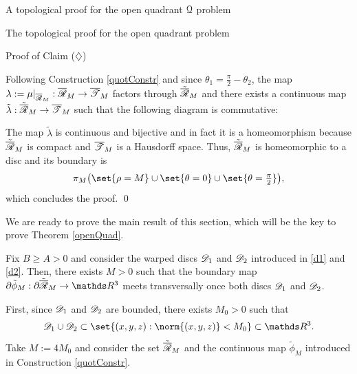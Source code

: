 \documentclass[11pt, a4paper, english, twoside, notitlepage, openright]{report}
\begin{document}
\begin{chapter}{A topological proof for the open quadrant $\mathcal{Q}$ problem}
\begin{section}{The topological proof for the open quadrant problem}
\begin{subsection}{Proof of Claim ($\diamondsuit$)}
\begin{lemma}
\begin{Proof}
Following Construction \ref{quotConstr} and since $\theta_1=\tfrac{\pi}{2}-\theta_2$, the map $\lambda:=\mu|_{\overline{\mathscr{R}}_M}:\overline{\mathscr{R}}_M\to\overline{\mathscr{T}}_M$ factors through $\tilde{\overline{\mathscr{R}}}_M$ and there exists a continuous map $\tilde{\lambda}:\tilde{\overline{\mathscr{R}}}_M\to\overline{\mathscr{T}}_M$ such that the following diagram is commutative:
\begin{center}
\end{center}
The map $\tilde{\lambda}$ is continuous and bijective and in fact it is a homeomorphism because $\tilde{\overline{\mathscr{R}}}_M$ is compact and $\overline{\mathscr{T}}_M$ is a Hausdorff space. Thus, $\tilde{\overline{\mathscr{R}}}_M$ is homeomorphic to a disc and its boundary is 
$$
\pi_M\big(\set{\rho=M}\cup\set{\theta=0}\cup\set{\theta=\tfrac{\pi}{2}}\big),
$$
which concludes the proof.
\qed
\end{Proof}
\end{lemma}

\vspace{1mm}

We are ready to prove the main result of this section, which will be the key to prove Theorem \ref{openQuad}.

\vspace{1mm}

\begin{lemma}\label{mainlemmatop}
Fix $B\ge A>0$ and consider the warped discs $\mathscr{D}_1$ and $\mathscr{D}_2$ introduced in \eqref{d1} and \eqref{d2}. Then, there exists $M>0$ such that the boundary map $\partial\tilde{\phi}_M:\partial\tilde{\overline{\Rr}}_M\to\R^3$ meets transversally once both discs $\mathscr{D}_1$ and $\mathscr{D}_2$.
\begin{Proof} First, since $\mathscr{D}_1$ and $\mathscr{D}_2$ are bounded, there exists $M_0>0$ such that 
$$
\D_1\cup\D_2\subset\set{(x,y,z):\norm{(x,y,z)}<M_0}\subset\R^3.
$$
Take $M:=4M_0$ and consider the set $\tilde{\overline{\mathscr{R}}}_M$ and the continuous map $\tilde{\phi}_M$ introduced in Construction \ref{quotConstr}.


\end{Proof}
\end{lemma}
\end{subsection}
\end{section}
\end{chapter}
\end{document}
